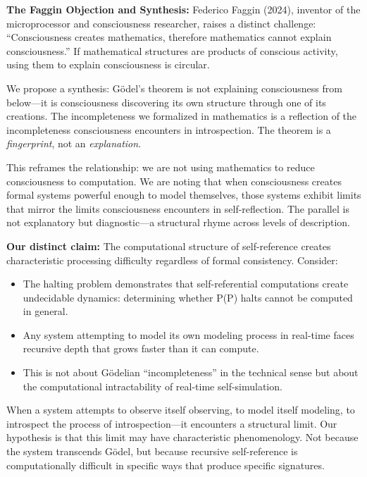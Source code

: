 \documentclass[12pt,a4paper]{article}
\begin{document}
\textbf{The Faggin Objection and Synthesis:} Federico Faggin (2024), inventor of the microprocessor and consciousness researcher, raises a distinct challenge: ``Consciousness creates mathematics, therefore mathematics cannot explain consciousness.'' If mathematical structures are products of conscious activity, using them to explain consciousness is circular.

We propose a synthesis: G\"{o}del's theorem is not explaining consciousness from below---it is consciousness discovering its own structure through one of its creations. The incompleteness we formalized in mathematics is a reflection of the incompleteness consciousness encounters in introspection. The theorem is a \textit{fingerprint}, not an \textit{explanation}.

This reframes the relationship: we are not using mathematics to reduce consciousness to computation. We are noting that when consciousness creates formal systems powerful enough to model themselves, those systems exhibit limits that mirror the limits consciousness encounters in self-reflection. The parallel is not explanatory but diagnostic---a structural rhyme across levels of description.

\textbf{Our distinct claim:} The computational structure of self-reference creates characteristic processing difficulty regardless of formal consistency. Consider:

\begin{itemize}
    \item The halting problem demonstrates that self-referential computations create undecidable dynamics: determining whether P(P) halts cannot be computed in general.

    \item Any system attempting to model its own modeling process in real-time faces recursive depth that grows faster than it can compute.

    \item This is not about G\"{o}delian ``incompleteness'' in the technical sense but about the computational intractability of real-time self-simulation.
\end{itemize}

When a system attempts to observe itself observing, to model itself modeling, to introspect the process of introspection---it encounters a structural limit. Our hypothesis is that this limit may have characteristic phenomenology. Not because the system transcends G\"{o}del, but because recursive self-reference is computationally difficult in specific ways that produce specific signatures.
\end{document}
